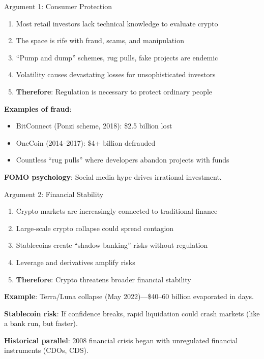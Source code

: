 ﻿\documentclass[aspectratio=169,11pt]{beamer}
\begin{document}
\begin{frame}{Argument 1: Consumer Protection}
\begin{argumentbox}
\begin{enumerate}
    \item Most retail investors lack technical knowledge to evaluate crypto
    \item The space is rife with fraud, scams, and manipulation
    \item ``Pump and dump'' schemes, rug pulls, fake projects are endemic
    \item Volatility causes devastating losses for unsophisticated investors
    \item \textbf{Therefore}: Regulation is necessary to protect ordinary people
\end{enumerate}
\end{argumentbox}

\vspace{0.3em}
\textbf{Examples of fraud}:
\begin{itemize}
    \item BitConnect (Ponzi scheme, 2018): \$2.5 billion lost
    \item OneCoin (2014--2017): \$4+ billion defrauded
    \item Countless ``rug pulls'' where developers abandon projects with funds
\end{itemize}

\textbf{FOMO psychology}: Social media hype drives irrational investment.
\end{frame}

\begin{frame}{Argument 2: Financial Stability}
\begin{argumentbox}
\begin{enumerate}
    \item Crypto markets are increasingly connected to traditional finance
    \item Large-scale crypto collapse could spread contagion
    \item Stablecoins create ``shadow banking'' risks without regulation
    \item Leverage and derivatives amplify risks
    \item \textbf{Therefore}: Crypto threatens broader financial stability
\end{enumerate}
\end{argumentbox}

\vspace{0.3em}
\textbf{Example}: Terra/Luna collapse (May 2022)---\$40--60 billion evaporated in days.

\textbf{Stablecoin risk}: If confidence breaks, rapid liquidation could crash markets (like a bank run, but faster).

\textbf{Historical parallel}: 2008 financial crisis began with unregulated financial instruments (CDOs, CDS).
\end{frame}
\end{document}
